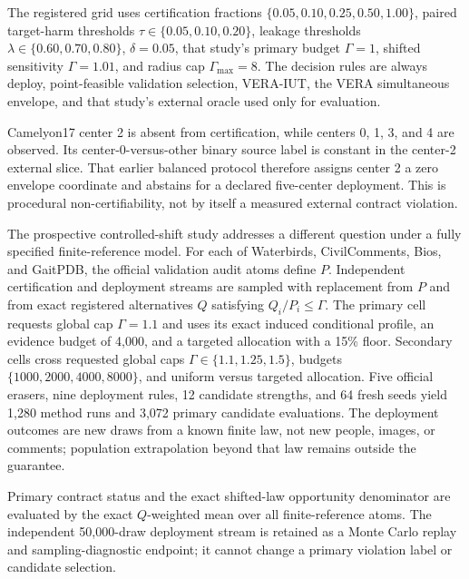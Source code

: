 The registered grid uses certification fractions
$\{0.05,0.10,0.25,0.50,1.00\}$, paired target-harm thresholds
$\tau\in\{0.05,0.10,0.20\}$, leakage thresholds
$\lambda\in\{0.60,0.70,0.80\}$, $\delta=0.05$, that study's primary budget
$\Gamma=1$,
shifted sensitivity $\Gamma=1.01$, and radius cap $\Gamma_{\max}=8$. The
decision rules are always deploy, point-feasible validation selection,
VERA-IUT, the VERA simultaneous envelope, and that study's external oracle used
only for evaluation.

Camelyon17 center 2 is absent from certification, while centers 0, 1, 3, and 4
are observed. Its center-0-versus-other binary source label is constant in the
center-2 external slice. That earlier balanced protocol therefore assigns center 2 a
zero envelope coordinate and abstains for a declared five-center deployment.
This is procedural non-certifiability, not by itself a measured external
contract violation.

The prospective controlled-shift study addresses a different question under a
fully specified finite-reference model. For each of Waterbirds,
CivilComments, Bios, and GaitPDB, the official validation audit atoms define
$P$. Independent certification and deployment streams are sampled with
replacement from $P$ and from exact registered alternatives $Q$ satisfying
$Q_i/P_i\leq\Gamma$. The primary cell requests global cap $\Gamma=1.1$ and
uses its exact induced conditional profile, an evidence budget of 4,000, and a
targeted allocation with a 15\% floor. Secondary cells cross requested global
caps $\Gamma\in\{1.1,1.25,1.5\}$, budgets
$\{1000,2000,4000,8000\}$, and uniform versus targeted allocation. Five
official erasers, nine deployment rules, 12 candidate strengths, and 64 fresh
seeds yield 1,280 method runs and 3,072 primary candidate evaluations. The
deployment outcomes are new draws from a known finite law, not new people,
images, or comments; population extrapolation beyond that law remains outside
the guarantee.

Primary contract status and the exact shifted-law opportunity denominator are
evaluated by the exact $Q$-weighted mean over all finite-reference atoms. The independent
50,000-draw deployment stream is retained as a Monte Carlo replay and
sampling-diagnostic endpoint; it cannot change a primary violation label or
candidate selection.


